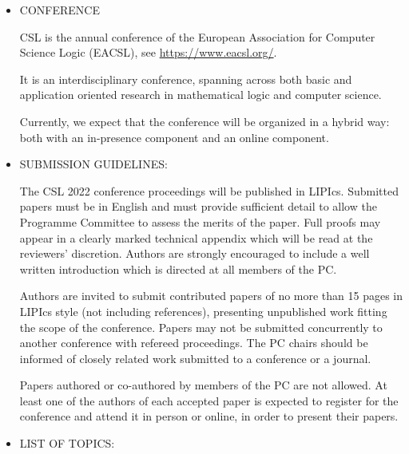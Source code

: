 \documentclass[prodmode,acmtecs]{acmsmall} %
\begin{document}
\begin{itemize}\item  CONFERENCE 
 
  CSL is the annual conference of the European Association for Computer Science Logic (EACSL), see \href{https://www.eacsl.org/}{https://www.eacsl.org/}.  
 
  It is an interdisciplinary conference, spanning across both basic and application oriented research in mathematical logic and computer science.    
 
  Currently, we expect that the conference will be organized in a hybrid way: both with an in-presence component and an online component.  
 
\item  SUBMISSION GUIDELINES: 
 
  The CSL 2022 conference proceedings will be published in LIPIcs. Submitted papers must be in English and must provide sufficient detail to allow the Programme Committee to assess the merits of the paper. Full proofs may appear in a clearly marked technical appendix which will be read at the reviewers' discretion. Authors are strongly encouraged to include a well written introduction which is directed at all members of the PC. 
 
  Authors are invited to submit contributed papers of no more than 15 pages in LIPIcs style (not including references), presenting unpublished work fitting the scope of the conference. Papers may not be submitted concurrently to another conference with refereed proceedings. The PC chairs should be informed of closely related work submitted to a conference or a journal. 
 
  Papers authored or co-authored by members of the PC are not allowed. At least one of the authors of each accepted paper is expected to register for the conference and attend it in person or online, in order to present their papers. 
 
\item  LIST OF TOPICS: 
 

\end{itemize}
\end{document}
